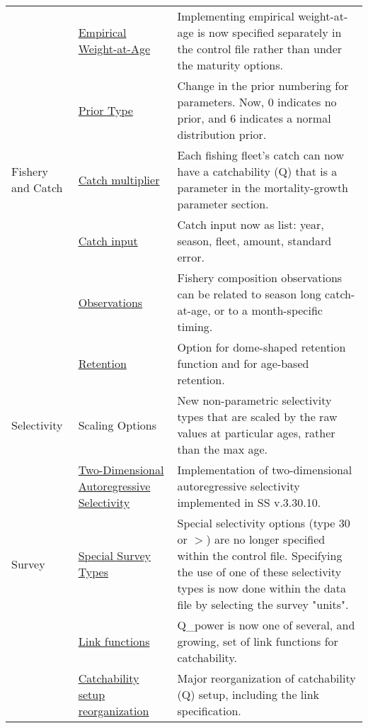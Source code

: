 \begin{center}
{\begin{longtable}{p{2cm} p{3cm} p{10cm}}
		  & \hyperlink{WAAparm} {Empirical Weight-at-Age} & Implementing empirical weight-at-age is now specified separately in the control file rather than under the maturity options.\\

		  & \hyperlink{Priors}{Prior Type} & Change in the prior numbering for parameters.  Now, 0 indicates no prior, and 6 indicates a normal distribution prior.\\

		Fishery and Catch & 
			\hyperlink{CatchMult}{Catch multiplier} & 
				Each fishing fleet's catch can now have a catchability (Q) that is a parameter in the mortality-growth parameter section.\\
				
			& \hyperlink{CatchFormat}{Catch input} & 
				Catch input now as list:  year, season, fleet, amount, standard error. \\
				
			& \hyperlink{CompTiming}{Observations} & 
				Fishery composition observations can be related to season long catch-at-age, or to a month-specific timing.\\
		
			& \hyperlink{DomeRetention}{Retention} & 
				Option for dome-shaped retention function and for age-based retention. \\

		Selectivity 
			& Scaling Options & 	
				New non-parametric selectivity types that are scaled by the raw values at particular ages, rather than the max age.\\
			& \hyperlink{2DAR}{Two-Dimensional Autoregressive Selectivity} &
				Implementation of two-dimensional autoregressive selectivity implemented in SS v.3.30.10.\\

		Survey
			& \hyperlink{SpecialSurvey}{Special Survey Types} & 
				Special selectivity options (type 30 or $>$) are no longer specified within the control file.  Specifying the use of one of these selectivity types is now done within the data file by selecting the survey "units". \\  

			& \hyperlink{Qsetup}{Link functions} & 
				Q\_power is now one of several, and growing, set of link functions for catchability. \\
				
			& \hyperlink{Qsetup}{Catchability setup reorganization} & 
				Major reorganization of catchability (Q) setup, including the link specification. \\
			

\end{longtable}}
\end{center}
